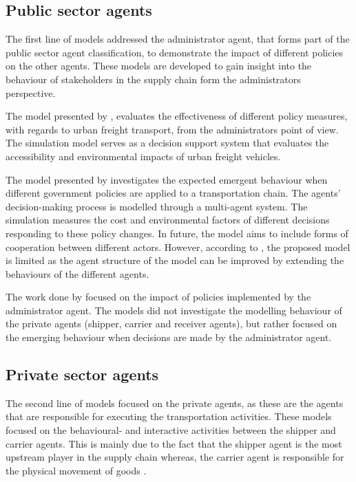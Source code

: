 \subsection{Public sector agents}
The first line of models addressed the administrator agent, that forms part of the public sector agent classification, to demonstrate the impact of different policies on the other agents. These models are developed to gain insight into the behaviour of stakeholders in the supply chain form the administrators perspective. \par

The model presented by \citet{visser1996simulation}, evaluates the effectiveness of different policy measures, with regards to urban freight transport, from the administrators point of view. The simulation model serves as a decision support system that evaluates the accessibility and environmental impacts of urban freight vehicles.\par

The model presented by \citet{bergkvist2004hybrid} investigates the expected emergent behaviour when different government policies are applied to a transportation chain. The agents' decision-making process is modelled through a multi-agent system. The simulation measures the cost and environmental factors of different decisions responding to these policy changes. In future, the model aims to include forms of cooperation between different actors. However, according to \citet{anand2014ontology}, the proposed model is limited as the agent structure of the model can be improved by extending the behaviours of the different agents. \par

The work done by \citet{visser1996simulation,bergkvist2004hybrid} focused on the impact of policies implemented by the administrator agent. The models did not investigate the modelling behaviour of the private agents (shipper, carrier and receiver agents), but rather focused on the emerging behaviour when decisions are made by the administrator agent.  \par
\subsection{Private sector agents}
The second line of models focused on the private agents, as these are the agents that are responsible for executing the transportation activities. These models focused on the behavioural- and interactive activities between the shipper and carrier agents. This is mainly due to the fact that the shipper agent is the most upstream player in the supply chain whereas, the carrier agent is responsible for the physical movement of goods \citep{bean2018}.\par


